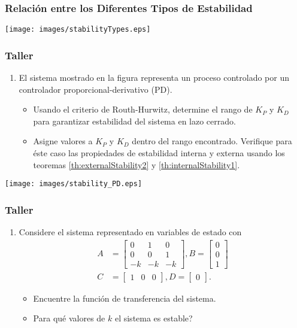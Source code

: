 \documentclass[aspectratio=169,handout]{beamer}
\theoremstyle{definition}
\theoremstyle{plain}
\theoremstyle{remark}
\newcounter{saveenumi}
\newcommand{\seti}{\setcounter{saveenumi}{\value{enumi}}}
\newcommand{\conti}{\setcounter{enumi}{\value{saveenumi}}}
\begin{document}
\begin{frame}[<-+>]\frametitle{Relación entre los Diferentes Tipos de Estabilidad}
\centering
\vspace*{5mm}
\texttt{[image: images/stabilityTypes.eps]}
\end{frame}

\begin{frame}\frametitle{Taller}
\begin{enumerate}
  \conti
  \item El sistema mostrado en la figura representa un proceso controlado por un controlador proporcional-derivativo (PD).
  \begin{itemize}
  	\item Usando el criterio de Routh-Hurwitz, determine el rango de $K_P$ y $K_D$ para garantizar estabilidad del sistema en lazo cerrado.
  	\item Asigne valores a $K_P$ y $K_D$ dentro del rango encontrado. Verifique para éste caso las propiedades de estabilidad interna y externa usando los teoremas \ref{th:externalStability2} y \ref{th:internalStability1}.
  \end{itemize}
  \seti
\end{enumerate}
\begin{center}
  \texttt{[image: images/stability\_PD.eps]}
\end{center}
\end{frame}

\begin{frame}\frametitle{Taller}
\begin{enumerate}
  \conti
  \item Considere el sistema representado en variables de estado con
  \begin{align*}
  	A &= 
  	\begin{bmatrix}
  		0  &  1 &  0\\
  		0  &  0 &  1\\
  		-k & -k & -k
  	\end{bmatrix},
  	B = 
  	\begin{bmatrix}
  		0 \\ 0 \\ 1
  	\end{bmatrix}\\
  	C &=
  	\begin{bmatrix}
  		1 & 0 & 0
  	\end{bmatrix}, 
  	D =
  	\begin{bmatrix}
  		0
  	\end{bmatrix}.
  \end{align*}
  \begin{itemize}
  	\item Encuentre la función de transferencia del sistema.
  	\item Para qué valores de $k$ el sistema es estable?
  \end{itemize}
  \seti
\end{enumerate}
\end{frame}
\end{document}
